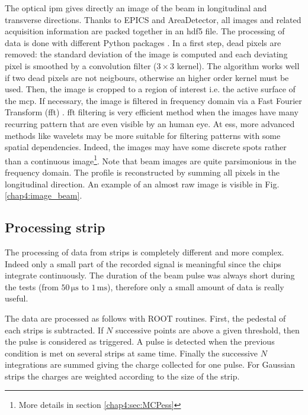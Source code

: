\begin{refsection}
  The optical \acrshort{ipm} gives directly an image of the beam in longitudinal and transverse directions. Thanks to EPICS and AreaDetector, all images and related acquisition information are packed together in an \acrshort{hdf}5 file. The processing of data is done with different Python packages \cite{NumPy2011,SciPy2019,Hunter2007}. In a first step, dead pixels are removed: the standard deviation of the image is computed and each deviating pixel is smoothed by a convolution filter ($3\times3$ kernel). The algorithm works well if two dead pixels are not neigbours, otherwise an higher order kernel must be used. Then, the image is cropped to a region of interest i.e. the active surface of the \acrshort{mcp}. If necessary, the image is filtered in frequency domain via a Fast Fourier Transform (\acrshort{fft}) \cite{Burrus2012}. \acrshort{fft} filtering is very efficient method when the images have many recurring pattern that are even visible by an human eye. At \acrshort{ess}, more advanced methods like wavelets \cite{Burrus1997,bultheel2014} may be more suitable for filtering patterns with some spatial dependencies. Indeed, the images may have some discrete spots rather than a continuous image\footnote{More details in section \ref{chap4:sec:MCPess}}. Note that beam images are quite parsimonious in the frequency domain. The profile is reconstructed by summing all pixels in the longitudinal direction. An example of an almost raw image is visible in Fig. \ref{chap4:image_beam}.

  

  \subsection{Processing strip}
  The processing of data from strips is completely different and more complex. Indeed only a small part of the recorded signal is meaningful since the chips integrate continuously. The duration of the beam pulse was always short during the tests (from $50\,\mathrm{\mu s}$ to $1\,\mathrm{ms}$), therefore only a small amount of data is really useful.

  The data are processed as follows with ROOT\cite{Brun1997,Antcheva2009} routines. First, the pedestal of each strips is subtracted. If $N$ successive points are above a given threshold, then the pulse is considered as triggered. A pulse is detected when the previous condition is met on several strips at same time. Finally the successive $N$ integrations are summed giving the charge collected for one pulse. For Gaussian strips the charges are weighted according to the size of the strip.


\end{refsection}
